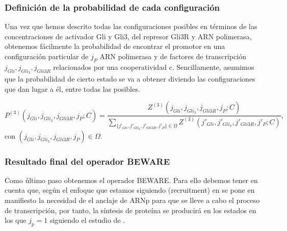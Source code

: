 \subsubsection{Definición de la probabilidad de cada configuración}

Una vez que hemos descrito todas las configuraciones posibles en términos de las concentraciones de activador Gli y Gli3, del represor Gli3R y ARN polimerasa, obtenemos fácilmente la probabilidad de encontrar el promotor en una configuración particular de $j_P$ ARN polimerasa y de factores de transcripción $j_{Gli}, j_{Gli_3}, j_{Gli3R}$ relacionados por una cooperatividad $c$. Sencillamente, asumimos que la probabilidad de cierto estado se va a obtener diviendo las configuraciones que dan lugar a él, entre todas las posibles.

\begin{equation}
P^{(3)}(j_{Gli}, j_{Gli_3}, j_{Gli3R},j_P;C)=\frac{Z^{(3)}(j_{Gli}, j_{Gli_3}, j_{Gli3R},j_P;C)}{\sum_{\{j'_{Gli}, j'_{Gli_3}, j'_{Gli3R},j'_P\}\in\Omega}Z^{(3)}(j'_{Gli}, j'_{Gli_3}, j'_{Gli3R},j'_P;C)},
\label{probabilidad}
\end{equation}
 con $(j_{Gli}, j_{Gli_3}, j_{Gli3R},j_P)\in\Omega$.
\subsubsection{Resultado final del operador BEWARE}
Como último paso obtenemos el operador BEWARE. Para ello debemos tener en cuenta que, según el enfoque que estamos siguiendo (recruitment) en \cite{shea1985or} se pone en manifiesto la necesidad de el anclaje de ARNp para que se lleve a cabo el proceso de transcripción, por tanto, la síntesis de proteína se producirá en los estados en los que $j_p=1$ siguiendo el estudio de \cite{bintu2005transcriptional,frank2012versatility}.

